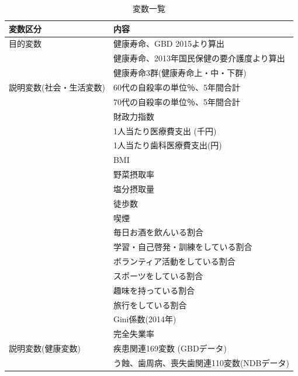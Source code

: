 \begin{table}[h!]
	\centering
	\caption{変数一覧}
	\label{variable}
	\begin{tabular}{ll}
		\hline
		変数区分                 & 内容                                       \\ \hline
		目的変数                 & 健康寿命、GBD 2015より算出                 \\
		                         & 健康寿命、2013年国民保健の要介護度より算出 \\
		                         & 健康寿命3群(健康寿命上・中・下群)          \\ \hline
		説明変数(社会・生活変数) & 60代の自殺率の単位％、5年間合計            \\
		                         & 70代の自殺率の単位％、5年間合計            \\
		                         & 財政力指数                                 \\
		                         & 1人当たり医療費支出 (千円)                 \\
		                         & 1人当たり歯科医療費支出(円)                \\
		                         & BMI                                        \\
		                         & 野菜摂取率                                 \\
		                         & 塩分摂取量                                 \\
		                         & 徒歩数                                     \\
		                         & 喫煙                                       \\
		                         & 毎日お酒を飲んいる割合                     \\
		                         & 学習・自己啓発・訓練をしている割合         \\
		                         & ボランティア活動をしている割合             \\
		                         & スポーツをしている割合                     \\
		                         & 趣味を持っている割合                       \\
		                         & 旅行をしている割合                         \\
		                         & Gini係数(2014年)                           \\
		                         & 完全失業率                                 \\ \hline
		説明変数(健康変数)       & 疾患関連169変数 (GBDデータ)                \\
		                         & う蝕、歯周病、喪失歯関連110変数(NDBデータ) \\
		\hline
	\end{tabular}
\end{table}

